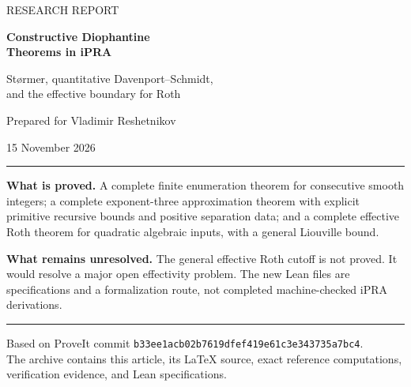 \documentclass[11pt,a4paper]{article}
\theoremstyle{definition}
\theoremstyle{remark}
\begin{document}
\begin{titlepage}
\vspace*{16mm}
{\large\color{accent}\sffamily RESEARCH REPORT}\par
\vspace{8mm}
{\Huge\color{ink}\bfseries Constructive Diophantine\\[3pt]
Theorems in iPRA}\par
\vspace{9mm}
{\Large St\o rmer, quantitative Davenport--Schmidt,\\[4pt]
and the effective boundary for Roth}\par
\vspace{12mm}
{\large Prepared for Vladimir Reshetnikov}\par
{\large 15 November 2026}\par
\vspace{15mm}
\hrule
\vspace{5mm}
\textbf{What is proved.}
A complete finite enumeration theorem for consecutive smooth integers;
a complete exponent-three approximation theorem with explicit primitive
recursive bounds and positive separation data; and a complete effective
Roth theorem for quadratic algebraic inputs, with a general Liouville bound.
\vspace{5mm}

\textbf{What remains unresolved.}
The general effective Roth cutoff is not proved.  It would resolve a major
open effectivity problem.  The new Lean files are specifications and a
formalization route, not completed machine-checked iPRA derivations.
\vspace{5mm}
\hrule
\vfill
{\small Based on ProveIt commit
\texttt{b33ee1acb02b7619dfef419e61c3e343735a7bc4}.\\
The archive contains this article, its LaTeX source, exact reference
computations, verification evidence, and Lean specifications.}
\end{titlepage}
\end{document}
